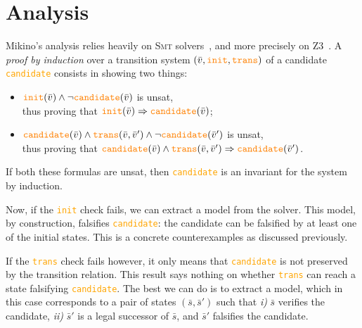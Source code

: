 \documentclass{easychair}
\newcommand{\Mkn}{Mikino}
\newcommand{\mkn}{mikino}
\newcommand{\smt}{\textsc{Smt}}
\newcommand{\ita}[1]{\textit{#1}}
\newcommand{\code}[1]{\textcolor{orange}{\texttt{#1}}}
\newcommand{\vars}{\bar{v}}
\newcommand{\state}{\bar{s}}
\newcommand{\init}{\code{init}}
\newcommand{\trans}{\code{trans}}
\newcommand{\cand}{\code{candidate}}
\newcommand{\true}{\code{true}}
\newcommand{\impl}{\Rightarrow}
\begin{document}
\section{Analysis}%
\label{sec:analysis}

\Mkn{}'s analysis relies heavily on \smt{} solvers~\cite{smt}, and more precisely on Z3~\cite{z3}.
%
A \ita{proof by induction} over a transition system \((\vars, \init, \trans)\) of a candidate
\cand{} consists in showing two things:
%
\begin{itemize}
    \item \(\init(\vars) \land \neg \cand(\vars)\) is unsat,\\
        thus proving that \(\init(\vars) \impl \cand(\vars)\);
    \item \(\cand(\vars) \land \trans(\vars, \vars') \land \neg \cand(\vars')\) is unsat,\\
        thus proving that \(\cand(\vars) \land \trans(\vars, \vars') \impl \cand(\vars')\).
\end{itemize}
%
If both these formulas are unsat, then \cand{} is an invariant for the system by induction.

\smallskip{}

Now, if the \init{} check fails, we can extract a model from the solver. This model, by
construction, falsifies \cand{}: the candidate can be falsified by at least one of the initial
states. This is a concrete counterexamples as discussed previously.

If the \trans{} check fails however, it only means that \cand{} is not preserved by the transition
relation. This result says nothing on whether \trans{} can reach a state falsifying \cand{}. The
best we can do is to extract a model, which in this case corresponds to a pair of states \((\state,
\state')\) such that \ita{i)} \(\state\) verifies the candidate, \ita{ii)} \(\state'\) is a legal
successor of \(\state\), and \(\state'\) falsifies the candidate.
\end{document}
